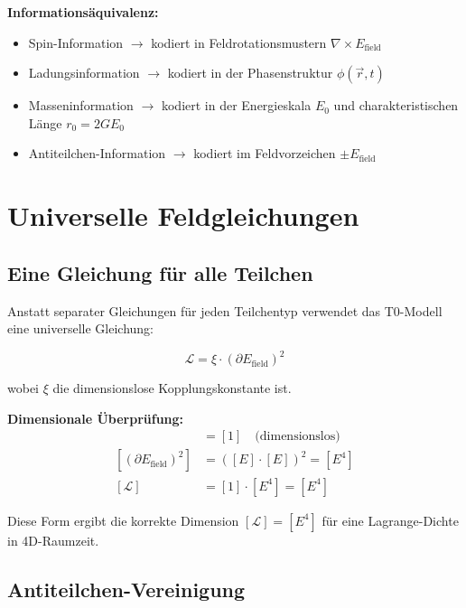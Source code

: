 \documentclass[12pt,a4paper]{report}
\begin{document}
	\textbf{Informationsäquivalenz:}
	\begin{itemize}
		\item Spin-Information $\rightarrow$ kodiert in Feldrotationsmustern $\nabla \times E_{\text{field}}$
		\item Ladungsinformation $\rightarrow$ kodiert in der Phasenstruktur $\phi(\vec{r}, t)$  
		\item Masseninformation $\rightarrow$ kodiert in der Energieskala $E_0$ und charakteristischen Länge $r_0 = 2GE_0$
		\item Antiteilchen-Information $\rightarrow$ kodiert im Feldvorzeichen $\pm E_{\text{field}}$
	\end{itemize}
	
	\section{Universelle Feldgleichungen}
	\label{sec:universal_equations}
	
\subsection{Eine Gleichung für alle Teilchen}
\label{subsec:single_equation}

Anstatt separater Gleichungen für jeden Teilchentyp verwendet das T0-Modell eine universelle Gleichung:

\begin{equation}
	\boxed{\mathcal{L} = \xi \cdot (\partial E_{\text{field}})^2}
	\label{eq:universal_lagrangian}
\end{equation}

wobei $\xi$ die dimensionslose Kopplungskonstante ist.

\textbf{Dimensionale Überprüfung:}
\begin{align}
	[\xi] &= [1] \quad \text{(dimensionslos)} \\
	[(\partial E_{\text{field}})^2] &= ([E] \cdot [E])^2 = [E^4] \\
	[\mathcal{L}] &= [1] \cdot [E^4] = [E^4]
\end{align}

Diese Form ergibt die korrekte Dimension $[\mathcal{L}] = [E^4]$ für eine Lagrange-Dichte in 4D-Raumzeit.
	\subsection{Antiteilchen-Vereinigung}
	\label{subsec:antiparticle_unification}
	
\end{document}
